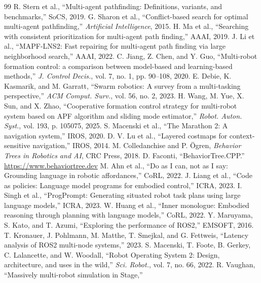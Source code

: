 \documentclass[10pt,twocolumn]{article}
\begin{document}
\begin{thebibliography}{99}\small
{} R. Stern et al., ``Multi-agent pathfinding: Definitions,
variants, and benchmarks,'' SoCS, 2019.
 G. Sharon et al., ``Conflict-based search for optimal multi-agent
pathfinding,'' \emph{Artificial Intelligence}, 2015.
 H. Ma et al., ``Searching with consistent prioritization for
multi-agent path finding,'' AAAI, 2019.
 J. Li et al., ``MAPF-LNS2: Fast repairing for multi-agent path
finding via large neighborhood search,'' AAAI, 2022.
 C. Jiang, Z. Chen, and Y. Guo, ``Multi-robot formation
control: a comparison between model-based and learning-based methods,''
\emph{J. Control Decis.}, vol. 7, no. 1, pp. 90--108, 2020.
 E. Debie, K. Kasmarik, and M. Garratt, ``Swarm robotics:
A survey from a multi-tasking perspective,'' \emph{ACM Comput. Surv.}, vol. 56,
no. 2, 2023.
 H. Wang, M. Yue, X. Sun, and X. Zhao, ``Cooperative formation
control strategy for multi-robot system based on APF algorithm and sliding mode
estimator,'' \emph{Robot. Auton. Syst.}, vol. 193, p. 105075, 2025.
 S. Macenski et al., ``The Marathon 2: A navigation system,''
IROS, 2020.
 D. V. Lu et al., ``Layered costmaps for context-sensitive
navigation,'' IROS, 2014.
 M. Colledanchise and P. Ögren, \emph{Behavior Trees in
Robotics and AI}, CRC Press, 2018.
 D. Faconti, ``BehaviorTree.CPP.'' \url{https://www.behaviortree.dev}
 M. Ahn et al., ``Do as I can, not as I say: Grounding language
in robotic affordances,'' CoRL, 2022.
 J. Liang et al., ``Code as policies: Language model
programs for embodied control,'' ICRA, 2023.
 I. Singh et al., ``ProgPrompt: Generating situated robot
task plans using large language models,'' ICRA, 2023.
 W. Huang et al., ``Inner monologue: Embodied reasoning
through planning with language models,'' CoRL, 2022.
 Y. Maruyama, S. Kato, and T. Azumi, ``Exploring the performance
of ROS2,'' EMSOFT, 2016.
 T. Kronauer, J. Pohlmann, M. Matthe, T. Smejkal, and
G. Fettweis, ``Latency analysis of ROS2 multi-node systems,'' 2023.
 S. Macenski, T. Foote, B. Gerkey, C. Lalancette, and W. Woodall,
``Robot Operating System 2: Design, architecture, and uses in the wild,''
\emph{Sci. Robot.}, vol. 7, no. 66, 2022.
 R. Vaughan, ``Massively multi-robot simulation in Stage,''

\end{thebibliography}
\end{document}
